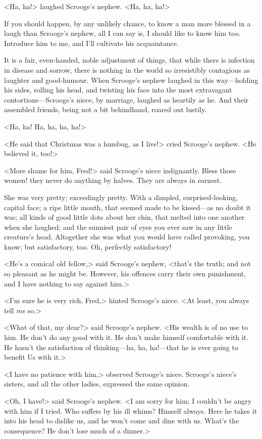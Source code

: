 <Ha, ha!> laughed Scrooge's nephew. <Ha, ha, ha!>

If you should happen, by any unlikely chance, to know a man more blessed in a
laugh than Scrooge's nephew, all I can say is, I should like to know him too.
Introduce him to me, and I'll cultivate his acquaintance.

It is a fair, even-handed, noble adjustment of things, that while there is
infection in disease and sorrow, there is nothing in the world so irresistibly
contagious as laughter and good-humour. When Scrooge's nephew laughed in this
way—holding his sides, rolling his head, and twisting his face into the most
extravagant contortions—Scrooge's niece, by marriage, laughed as heartily as he.
And their assembled friends, being not a bit behindhand, roared out lustily.

<Ha, ha! Ha, ha, ha, ha!>

<He said that Christmas was a humbug, as I live!> cried Scrooge's nephew. <He
believed it, too!>

<More shame for him, Fred!> said Scrooge's niece indignantly. Bless those women!
they never do anything by halves. They are always in earnest.

She was very pretty; exceedingly pretty. With a dimpled, surprised-looking,
capital face; a ripe little mouth, that seemed made to be kissed—as no doubt it
was; all kinds of good little dots about her chin, that melted into one another
when she laughed; and the sunniest pair of eyes you ever saw in any little
creature's head. Altogether she was what you would have called provoking, you
know; but satisfactory, too. Oh, perfectly satisfactory!

<He's a comical old fellow,> said Scrooge's nephew, <that's the truth; and not
so pleasant as he might be. However, his offences carry their own punishment,
and I have nothing to say against him.>

<I'm sure he is very rich, Fred,> hinted Scrooge's niece. <At least, you always
tell \emph{me} so.>

<What of that, my dear?> said Scrooge's nephew. <His wealth is of no use to him.
He don't do any good with it. He don't make himself comfortable with it. He
hasn't the satisfaction of thinking—ha, ha, ha!—that he is ever going to benefit
Us with it.>

<I have no patience with him,> observed Scrooge's niece. Scrooge's niece's
sisters, and all the other ladies, expressed the same opinion.

<Oh, I have!> said Scrooge's nephew. <I am sorry for him; I couldn't be angry
with him if I tried. Who suffers by his ill whims? Himself always. Here he takes
it into his head to dislike us, and he won't come and dine with us. What's the
consequence? He don't lose much of a dinner.>

